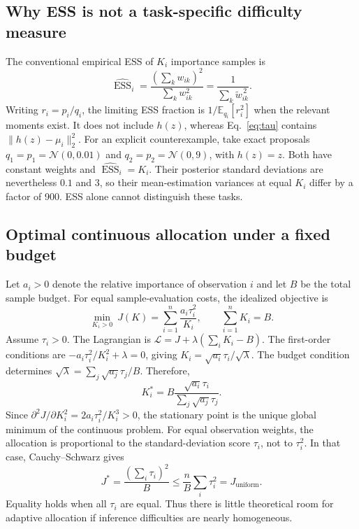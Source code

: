 \documentclass[10pt,letterpaper]{article}
\newcommand{\E}{\mathbb E}
\newcommand{\N}{\mathcal N}
\newcommand{\norm}[1]{\lVert #1\rVert_2}
\newcommand{\ESS}{\operatorname{ESS}}
\begin{document}
\subsection{Why ESS is not a task-specific difficulty measure}
The conventional empirical ESS of $K_i$ importance samples is
\begin{equation}
 \widehat{\ESS}_i=\frac{(\sum_k w_{ik})^2}{\sum_k w_{ik}^2}=\frac{1}{\sum_k\widetilde w_{ik}^{\,2}}.
\end{equation}
Writing $r_i=p_i/q_i$, the limiting ESS fraction is $1/\E_{q_i}[r_i^2]$ when the relevant moments exist. It does not include $h(z)$, whereas Eq.~\eqref{eq:tau} contains $\norm{h(z)-\mu_i}^2$. For an explicit counterexample, take exact proposals $q_1=p_1=\N(0,0.01)$ and $q_2=p_2=\N(0,9)$, with $h(z)=z$. Both have constant weights and $\widehat{\ESS}_i=K_i$. Their posterior standard deviations are nevertheless $0.1$ and $3$, so their mean-estimation variances at equal $K_i$ differ by a factor of 900. ESS alone cannot distinguish these tasks.
\subsection{Optimal continuous allocation under a fixed budget}
Let $a_i>0$ denote the relative importance of observation $i$ and let $B$ be the total sample budget. For equal sample-evaluation costs, the idealized objective is
\begin{equation}
 \min_{K_i>0}\ J(K)=\sum_{i=1}^n\frac{a_i\tau_i^2}{K_i},\qquad \sum_{i=1}^n K_i=B.
 \label{eq:opt}
\end{equation}
Assume $\tau_i>0$. The Lagrangian is $\mathcal L=J+\lambda(\sum_i K_i-B)$. The first-order conditions are $-a_i\tau_i^2/K_i^2+\lambda=0$, giving $K_i=\sqrt{a_i}\tau_i/\sqrt\lambda$. The budget condition determines $\sqrt\lambda=\sum_j\sqrt{a_j}\tau_j/B$. Therefore,
\begin{equation}
 {K_i^*=B\frac{\sqrt{a_i}\tau_i}{\sum_j\sqrt{a_j}\tau_j}.}
 \label{eq:optimal}
\end{equation}
Since $\partial^2 J/\partial K_i^2=2a_i\tau_i^2/K_i^3>0$, the stationary point is the unique global minimum of the continuous problem. For equal observation weights, the allocation is proportional to the standard-deviation score $\tau_i$, not to $\tau_i^2$. In that case, Cauchy--Schwarz gives
\begin{equation}
 J^*=\frac{(\sum_i\tau_i)^2}{B}\leq \frac{n}{B}\sum_i\tau_i^2=J_{\mathrm{uniform}}.
\end{equation}
Equality holds when all $\tau_i$ are equal. Thus there is little theoretical room for adaptive allocation if inference difficulties are nearly homogeneous.
\end{document}
